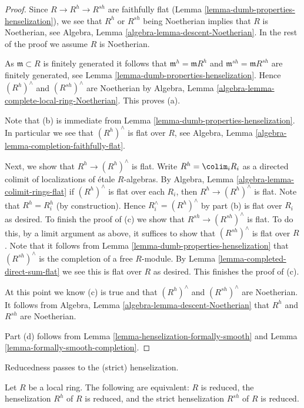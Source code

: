 \begin{proof}
Since $R \to R^h \to R^{sh}$ are faithfully flat
(Lemma \ref{lemma-dumb-properties-henselization}),
we see that $R^h$ or $R^{sh}$ being Noetherian implies that $R$
is Noetherian, see Algebra, Lemma \ref{algebra-lemma-descent-Noetherian}.
In the rest of the proof we assume $R$ is Noetherian.

\medskip\noindent
As $\mathfrak m \subset R$ is finitely generated it follows that
$\mathfrak m^h = \mathfrak m R^h$ and $\mathfrak m^{sh} = \mathfrak mR^{sh}$
are finitely generated, see Lemma \ref{lemma-dumb-properties-henselization}.
Hence $(R^h)^\wedge$ and $(R^{sh})^\wedge$ are Noetherian by
Algebra, Lemma \ref{algebra-lemma-complete-local-ring-Noetherian}.
This proves (a).

\medskip\noindent
Note that (b) is immediate from
Lemma \ref{lemma-dumb-properties-henselization}.
In particular we see that $(R^h)^\wedge$ is flat over $R$, see
Algebra, Lemma \ref{algebra-lemma-completion-faithfully-flat}.

\medskip\noindent
Next, we show that $R^h \to (R^h)^\wedge$ is flat.
Write $R^h = \colim_i R_i$ as a directed colimit of
localizations of \'etale $R$-algebras. By
Algebra, Lemma \ref{algebra-lemma-colimit-rings-flat}
if $(R^h)^\wedge$ is flat over each $R_i$, then $R^h \to (R^h)^\wedge$ is
flat. Note that $R^h = R_i^h$ (by construction).
Hence $R_i^\wedge = (R^h)^\wedge$
by part (b) is flat over $R_i$ as desired. To finish the proof of (c)
we show that $R^{sh} \to (R^{sh})^\wedge$ is flat. To do this, by a
limit argument as above, it suffices to show that $(R^{sh})^\wedge$
is flat over $R$. Note that it follows from
Lemma \ref{lemma-dumb-properties-henselization}
that $(R^{sh})^\wedge$ is the completion of a free $R$-module.
By Lemma \ref{lemma-completed-direct-sum-flat}
we see this is flat over $R$ as desired. This finishes the proof of (c).

\medskip\noindent
At this point we know (c) is true and that $(R^h)^\wedge$ and
$(R^{sh})^\wedge$ are Noetherian. It follows from
Algebra, Lemma \ref{algebra-lemma-descent-Noetherian}
that $R^h$ and $R^{sh}$ are Noetherian.

\medskip\noindent
Part (d) follows from Lemma \ref{lemma-henselization-formally-smooth}
and Lemma \ref{lemma-formally-smooth-completion}.
\end{proof}

\begin{lemma}
\label{lemma-henselization-reduced}
\begin{slogan}
Reducedness passes to the (strict) henselization.
\end{slogan}
Let $R$ be a local ring.
The following are equivalent: $R$ is reduced,
the henselization $R^h$ of $R$ is reduced, and
the strict henselization $R^{sh}$ of $R$ is reduced.
\end{lemma}

